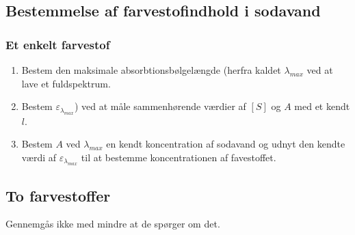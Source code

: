 \subsection{Bestemmelse af farvestofindhold i sodavand}
\subsubsection{Et enkelt farvestof}
\begin{enumerate}
    \item Bestem den maksimale absorbtionsbølgelængde (herfra kaldet $\lambda_{max}$ ved at lave et fuldspektrum.
    
    \item Bestem $\varepsilon_{\lambda_{max}}$) ved at måle sammenhørende værdier af $[S]$ og $A$ med et kendt $l$.
    
    \item Bestem $A$ ved $\lambda_{max}$ en kendt koncentration af sodavand og udnyt den kendte værdi af $\varepsilon_{\lambda_{max}}$ til at bestemme koncentrationen af favestoffet.  
\end{enumerate}

\subsection{To farvestoffer}
Gennemgås ikke med mindre at de spørger om det.
